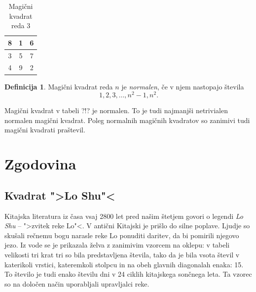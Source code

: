 \documentclass[a4paper,12pt]{article}
\theoremstyle{plain}
\theoremstyle{definition}
\newtheorem{definicija}[izrek]{Definicija}
\newcommand{\pojem}[1]{\emph{\color{purple}#1}}
\begin{document}


\begin{table}[h]
   \centering
   \caption{Magični kvadrat reda 3}
   \label{table:mag3}
   \large
   \begin{tabular}{|c|c|c|}
      \hline
      8 & 1 & 6 \\ \hline
      3 & 5 & 7 \\ \hline
      4 & 9 & 2 \\ \hline
   \end{tabular}
   \normalsize
\end{table}

\begin{definicija}
   Magični kvadrat reda $n$ je \pojem{normalen}, če v njem nastopajo števila
   \begin{equation}
      \label{eq:numbers}
      1, 2, 3, \ldots, n^2-1, n^2.
   \end{equation}
\end{definicija}

Magični kvadrat v tabeli ?!? je normalen.
To je tudi najmanjši netrivialen normalen magični kvadrat.
Poleg normalnih magičnih kvadratov so zanimivi tudi magični kvadrati praštevil.


\section{Zgodovina}

\subsection{Kvadrat ">Lo Shu"<}

Kitajska literatura iz časa vsaj 2800 let pred našim štetjem govori o legendi
\pojem{Lo Shu} -- ">zvitek reke Lo"<. V antični Kitajski je prišlo do
silne poplave. Ljudje so skušali rečnemu bogu narasle reke Lo ponuditi daritev,
da bi pomirili njegovo jezo. Iz vode se je prikazala želva z zanimivim vzorcem
na oklepu: v tabeli velikosti tri krat tri so bila predstavljena števila, tako
da je bila vsota števil v katerikoli vrstici, kateremkoli stolpcu in na obeh
glavnih diagonalah enaka: 15. To število je tudi enako številu dni v 24 ciklih
kitajskega sončnega leta. Ta vzorec so na določen način uporabljali upravljalci
reke.
\end{document}
